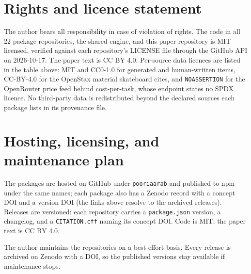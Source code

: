 \documentclass[twoside,11pt]{article}
\begin{document}
\begin{itemize}\small

\end{itemize}

\section{Rights and licence statement}
The author bears all responsibility in case of violation of rights. The
code in all 22 package repositories, the shared engine, and this paper
repository is MIT licensed, verified against each repository's LICENSE
file through the GitHub API on 2026-10-17. The paper text is CC BY 4.0.
Per-source data licences are listed in the table above: MIT and CC0-1.0
for generated and human-written items, CC-BY-4.0 for the OpenStax
material skateboard cites, and \texttt{NOASSERTION} for the OpenRouter
price feed behind cost-per-task, whose endpoint states no SPDX licence.
No third-party data is redistributed beyond the declared sources each
package lists in its provenance file.

\section{Hosting, licensing, and maintenance plan}
The packages are hosted on GitHub under \texttt{pooriaarab} and published
to npm under the same names; each package also has a Zenodo record with a
concept DOI and a version DOI (the links above resolve to the archived
releases). Releases are versioned: each repository carries a
\texttt{package.json} version, a changelog, and a \texttt{CITATION.cff}
naming its concept DOI. Code is MIT; the paper text is CC BY 4.0.

\noindent The author maintains the repositories on a best-effort basis. Every release is
archived on Zenodo with a DOI, so the published versions stay available if
maintenance stops.
\end{document}
